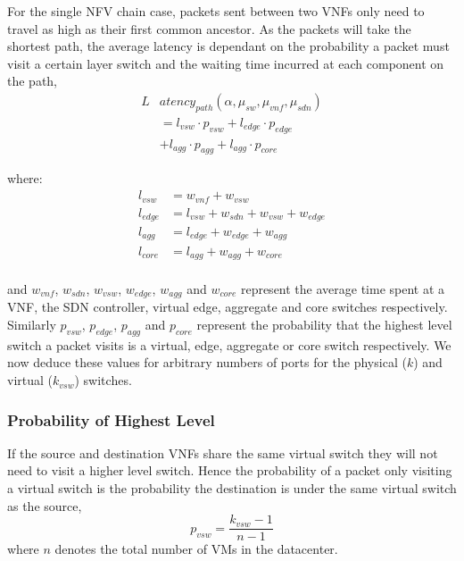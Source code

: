 For the single NFV chain case, packets sent between two VNFs only need to travel as high as their first common ancestor. As the packets will take the shortest path, the average latency is dependant on the probability a packet must visit a certain layer switch and the waiting time incurred at each component on the path,
\begin{equation} 
\label{eq:mean_latency}
\begin{split}
L&atency_{path}(\alpha, \mu_{sw}, \mu_{vnf}, \mu_{sdn}) \\
		&=l_{vsw} \cdot p_{vsw} + l_{edge} \cdot p_{edge} \\
	 	&+l_{agg} \cdot p_{agg} + l_{agg} \cdot p_{core}
\end{split}
\end{equation}

\noindent where:
\begin{equation}
\begin{split}
l_{vsw} &= w_{vnf} + w_{vsw} \\
l_{edge} &= l_{vsw} + w_{sdn} + w_{vsw} + w_{edge} \\
l_{agg} &= l_{edge} + w_{edge} + w_{agg} \\
l_{core} &= l_{agg} + w_{agg} + w_{core} \\
\end{split}
\end{equation}

\noindent and $w_{vnf}$, $w_{sdn}$, $w_{vsw}$, $w_{edge}$, $w_{agg}$ and $w_{core}$ represent the average time spent at a VNF, the SDN controller, virtual edge, aggregate and core switches respectively. Similarly $p_{vsw}$, $p_{edge}$, $p_{agg}$ and $p_{core}$ represent the probability that the highest level switch a packet visits is a virtual, edge, aggregate or core switch respectively. We now deduce these values for arbitrary numbers of ports for the physical ($k$) and virtual ($k_{vsw}$) switches.

\subsubsection{Probability of Highest Level}
If the source and destination VNFs share the same virtual switch they will not need to visit a higher level switch. Hence the probability of a packet only visiting a virtual switch is the probability the destination is under the same virtual switch as the source,
\begin{equation}
\label{eq:p_vm}
p_{vsw} = \frac{k_{vsw} - 1}{n - 1}
\end{equation}
\noindent where $n$ denotes the total number of VMs in the datacenter.

